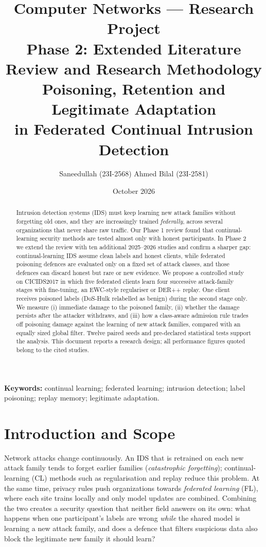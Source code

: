 \documentclass[10pt,a4paper]{article}
\title{\textbf{Computer Networks --- Research Project}\\[4pt]
\large Phase 2: Extended Literature Review and Research Methodology\\[8pt]
\Large Poisoning, Retention and Legitimate Adaptation\\in Federated Continual Intrusion Detection}
\author{Saneedullah (23I-2568) \qquad Ahmed Bilal (23I-2581)}
\date{October 2026}
\begin{document}
\maketitle

\begin{abstract}
Intrusion detection systems (IDS) must keep learning new attack families without forgetting old ones, and they are increasingly trained \emph{federally}, across several organizations that never share raw traffic. Our Phase 1 review found that continual-learning security methods are tested almost only with honest participants. In Phase 2 we extend the review with ten additional 2025--2026 studies and confirm a sharper gap: continual-learning IDS assume clean labels and honest clients, while federated poisoning defences are evaluated only on a fixed set of attack classes, and those defences can discard honest but rare or new evidence. We propose a controlled study on CICIDS2017 in which five federated clients learn four successive attack-family stages with fine-tuning, an EWC-style regulariser or DER++ replay. One client receives poisoned labels (DoS-Hulk relabelled as benign) during the second stage only. We measure (i) immediate damage to the poisoned family, (ii) whether the damage persists after the attacker withdraws, and (iii) how a class-aware admission rule trades off poisoning damage against the learning of new attack families, compared with an equally sized global filter. Twelve paired seeds and pre-declared statistical tests support the analysis. This document reports a research design; all performance figures quoted belong to the cited studies.
\end{abstract}
\noindent\textbf{Keywords:} continual learning; federated learning; intrusion detection; label poisoning; replay memory; legitimate adaptation.

\section{Introduction and Scope}
Network attacks change continuously. An IDS that is retrained on each new attack family tends to forget earlier families (\emph{catastrophic forgetting}); continual-learning (CL) methods such as regularisation and replay reduce this problem. At the same time, privacy rules push organizations towards \emph{federated learning} (FL), where each site trains locally and only model updates are combined. Combining the two creates a security question that neither field answers on its own: what happens when one participant's labels are wrong \emph{while} the shared model is learning a new attack family, and does a defence that filters suspicious data also block the legitimate new family it should learn?
\end{document}
